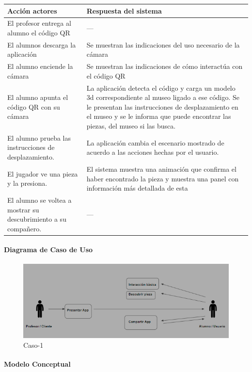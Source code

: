 \begin{longtable}{|p{5cm}|p{8cm}|}
\hline 
Acción actores & Respuesta del sistema \\ 
\hline 
El profesor entrega al alumno el código QR & --- \\ 
\hline
El alumnos descarga la aplicación & Se muestran las indicaciones del uso necesario de la cámara \\ 
\hline 
El alumno enciende la cámara  & Se muestran las indicaciones de cómo interactúa con el código QR \\ 
\hline
El alumno apunta el código QR con su cámara & La aplicación detecta el código y carga un modelo 3d correspondiente al museo ligado a ese código.
Se le presentan las instrucciones de desplazamiento en el museo y se le informa que puede encontrar las piezas, del museo si las busca.
 \\ 
\hline
El alumno prueba las instrucciones de desplazamiento. & La aplicación cambia el escenario mostrado de acuerdo a las acciones hechas por el usuario. \\ 
\hline
El jugador ve una pieza y la presiona. & El sistema muestra una animación que confirma el haber encontrado la pieza y muestra una panel con información más detallada de esta \\ 
\hline
El alumno se voltea a mostrar su descubrimiento a su compañero. & --- \\ 
\hline
\end{longtable}

\paragraph{Diagrama de Caso de Uso}

\begin{figure}[H]
\centerline{\includegraphics[width=15cm]{imgs/CasoUso_1.PNG}}
\caption{Caso-1}
\label{fig}
\end{figure}

\paragraph{Modelo Conceptual}

